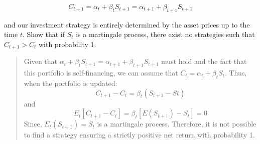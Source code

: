 \documentclass[11pt,]{article}
\begin{document}
\[
C_{t+1} = \alpha_t + \beta_t S_{t+1} = \alpha_{t+1} + \beta_{t+1} S_{t+1}
\]

and our investment strategy is entirely determined by the asset prices
up to the time \(t\). Show that if \(S_t\) is a martingale process,
there exist no strategies such that \(C_{t+1} > C_t\) with probability
1.

\begin{quote}
Given that
\(\alpha_t + \beta_t S_{t+1} = \alpha_{t+1} + \beta_{t+1} S_{t+1}\) must
hold and the fact that this portfolio is self-financing, we can assume
that \(C_t = \alpha_t + \beta_t S_t\). Thus, when the portfolio is
updated: \[
C_{t+1} -C_t = \beta_t (S_{t+1} - S{t})
\] and \[
E_t[C_{t+1} -C_t] = \beta_t[E(S_{t+1}) - S_t] = 0
\] Since, \(E_t(S_{t+1}) = S_t\) is a martingale process. Therefore, it
is not possible to find a strategy ensuring a strictly positive net
return with probability 1.
\end{quote}
\newpage
\singlespacing 
\end{document}
